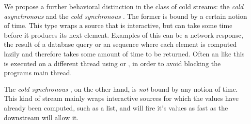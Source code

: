We propose a further behavioral distinction in the class of cold streams: the \textit{cold asynchronous \obs} and the \textit{cold synchronous \obs}. The former is bound by a certain notion of time. This type wraps a source that is interactive, but can take some time before it produces its next element. Examples of this can be a network response, the result of a database query or an \ieb sequence where each element is computed lazily and therefore takes some amount of time to be returned. Often an \obs like this is executed on a different thread using  or , in order to avoid blocking the programs main thread.

The \textit{cold synchronous \obs}, on the other hand, is \emph{not} bound by any notion of time. This kind of stream mainly wraps interactive sources for which the values have already been computed, such as a list, and will fire it's values as fast as the downstream will allow it.
